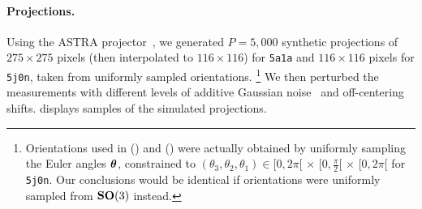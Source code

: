 \paragraph{Projections.}
Using the ASTRA projector~\cite{van2015astra}, we generated $P=5,000$ synthetic projections of $275 \times 275$ pixels (then interpolated to $116 \times 116$) for \texttt{5a1a} and $116 \times 116$ pixels for \texttt{5j0n}, taken from uniformly sampled orientations.%
\footnote{Orientations used in  () and  () were actually obtained by uniformly sampling the Euler angles ${\boldsymbol{\theta}}$, constrained to $(\theta_3,\theta_2,\theta_1) \in [0, 2\pi[ \, \times \, [0, \frac{\pi}{2}[ \, \times \, [0, 2\pi[$ for \texttt{5j0n}. Our conclusions would be identical if orientations were uniformly sampled from $\mathrm{\mathbf{SO}}(3)$ instead.}
We then perturbed the measurements with different levels of additive Gaussian noise~\cite{sorzano2004normalizing,shigematsu2013noise} and off-centering shifts. %
 displays samples of the simulated projections.


